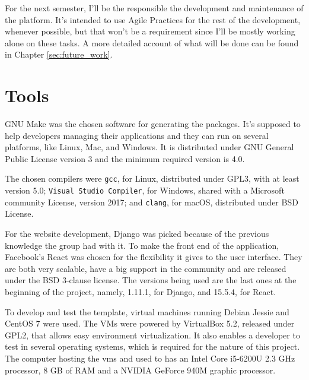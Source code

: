 For the next semester, I'll be the responsible the development and maintenance of the platform. It's intended to use Agile Practices for the rest of the development, whenever possible, but that won't be a requirement since I'll be mostly working alone on these tasks. A more detailed account of what will be done can be found in Chapter \ref{sec:future_work}.


\section{Tools}
\label{sec:tools}

GNU Make was the chosen software for generating the packages. It's supposed to help developers managing their applications and they can  run on several platforms, like Linux, Mac, and Windows. It is distributed under GNU General Public License version 3 and the minimum required version is 4.0.

The chosen compilers were \texttt{gcc}, for Linux, distributed under GPL3, with at least version 5.0; \texttt{Visual Studio Compiler}, for Windows, shared with a Microsoft community License, version 2017; and \texttt{clang}, for macOS, distributed under BSD License.

For the website development, Django was picked because of the previous knowledge the group had with it. To make the front end of the application, Facebook's React was chosen for the flexibility it gives to the user interface. They are both very scalable, have a big support in the community and are released under the BSD 3-clause license. The versions being used are the last ones at the beginning of the project, namely, 1.11.1, for Django, and 15.5.4, for React.


To develop and test the template, virtual machines running Debian Jessie and CentOS 7 were used. The VMs were powered by VirtualBox 5.2, released under GPL2, that allows easy environment virtualization. It also enables a developer to test in several operating systems, which is required for the nature of this project. The computer hosting the vms and used to has an Intel Core i5-6200U 2.3 GHz processor, 8 GB of RAM and a NVIDIA GeForce 940M graphic processor.

